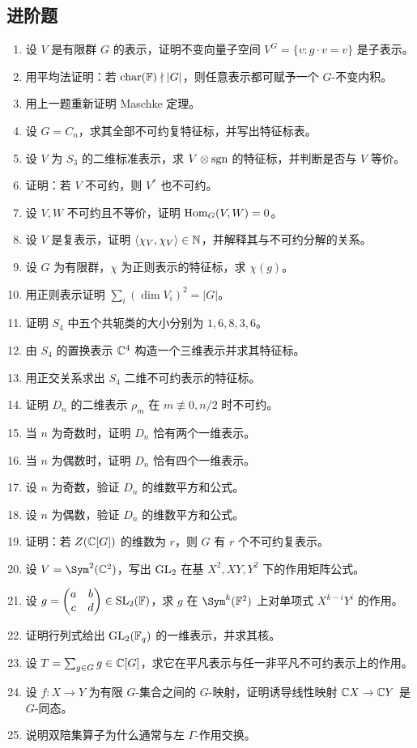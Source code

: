 \subsection*{进阶题}
\begin{enumerate}[resume, label=\textbf{\arabic*.}, leftmargin=*, itemsep=0.5em]
\item \medium 设 $V$ 是有限群 $G$ 的表示，证明不变向量子空间 $V^G=\{v:g\cdot v=v\}$ 是子表示。
\item \medium 用平均法证明：若 $\mathrm{char}(\mathbb{F})\nmid |G|$，则任意表示都可赋予一个 $G$-不变内积。
\item \medium 用上一题重新证明 Maschke 定理。
\item \medium 设 $G=C_n$，求其全部不可约复特征标，并写出特征标表。
\item \medium 设 $V$ 为 $S_3$ 的二维标准表示，求 $V\otimes \operatorname{sgn}$ 的特征标，并判断是否与 $V$ 等价。
\item \medium 证明：若 $V$ 不可约，则 $V^*$ 也不可约。
\item \medium 设 $V,W$ 不可约且不等价，证明 $\mathrm{Hom}_G(V,W)=0$。
\item \medium 设 $V$ 是复表示，证明 $\langle \chi_V, \chi_V \rangle\in \mathbb{N}$，并解释其与不可约分解的关系。
\item \medium 设 $G$ 为有限群，$\chi$ 为正则表示的特征标，求 $\chi(g)$。
\item \medium 用正则表示证明 $\sum_i (\dim V_i)^2=|G|$。
\item \medium 证明 $S_4$ 中五个共轭类的大小分别为 $1,6,8,3,6$。
\item \medium 由 $S_4$ 的置换表示 $\mathbb{C}^4$ 构造一个三维表示并求其特征标。
\item \medium 用正交关系求出 $S_4$ 二维不可约表示的特征标。
\item \medium 证明 $D_n$ 的二维表示 $\rho_m$ 在 $m\not\equiv 0,n/2$ 时不可约。
\item \medium 当 $n$ 为奇数时，证明 $D_n$ 恰有两个一维表示。
\item \medium 当 $n$ 为偶数时，证明 $D_n$ 恰有四个一维表示。
\item \medium 设 $n$ 为奇数，验证 $D_n$ 的维数平方和公式。
\item \medium 设 $n$ 为偶数，验证 $D_n$ 的维数平方和公式。
\item \medium 证明：若 $Z(\mathbb{C}[G])$ 的维数为 $r$，则 $G$ 有 $r$ 个不可约复表示。
\item \medium 设 $V=\Sym^2(\C^2)$，写出 $\mathrm{GL}_2$ 在基 $X^2,XY,Y^2$ 下的作用矩阵公式。
\item \medium 设 $g=\begin{pmatrix} a&b\\ c&d \end{pmatrix}\in \mathrm{SL}_2(\mathbb{F})$，求 $g$ 在 $\Sym^k(\F^2)$ 上对单项式 $X^{k-i}Y^i$ 的作用。
\item \medium 证明行列式给出 $\mathrm{GL}_2(\mathbb{F}_q)$ 的一维表示，并求其核。
\item \medium 设 $T=\sum_{g\in G} g\in \mathbb{C}[G]$，求它在平凡表示与任一非平凡不可约表示上的作用。
\item \medium 设 $f:X\to Y$ 为有限 $G$-集合之间的 $G$-映射，证明诱导线性映射 $\mathbb{C} X\to \mathbb{C} Y$ 是 $G$-同态。
\item \medium 说明双陪集算子为什么通常与左 $\Gamma$-作用交换。
\end{enumerate}
